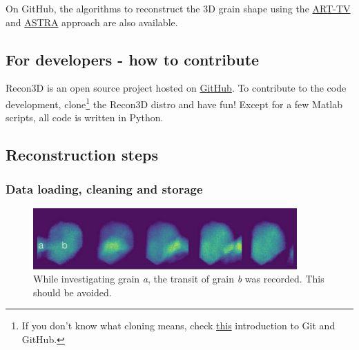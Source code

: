 \documentclass[11pt]{scrartcl}
\begin{document}
On GitHub, the algorithms to reconstruct the {\footnotesize{3D}} grain shape using the \href{https://github.com/albusdemens/ART-TV-for-DFXRM}{\footnotesize{ART-TV}} and \href{https://github.com/albusdemens/astrarecon}{\footnotesize{ASTRA}} approach are also available. 

\subsection{For developers - how to contribute}

Recon3D is an open source project hosted on \href{https://github.com/albusdemens/Recon3D}{GitHub}. To contribute to the code development, clone\footnote{If you don't know what cloning means, check \href{http://product.hubspot.com/blog/git-and-github-tutorial-for-beginners}{this} introduction to Git and GitHub.} the Recon3D distro and have fun! Except for a few Matlab scripts, all code is written in Python. 

\subsection{Reconstruction steps}
\label{sec:rec_steps}

\subsubsection{Data loading, cleaning and storage}
\label{sec:load_clean_store}

\begin{figure}[h]
    \centering
    \includegraphics[width=0.9\textwidth]{grain_transit}
    \caption{While investigating grain {\emph{a}}, the transit of grain {\emph{b}} was recorded. This should be avoided.}
    \label{fig:grain_transit}
\end{figure}
\end{document}
